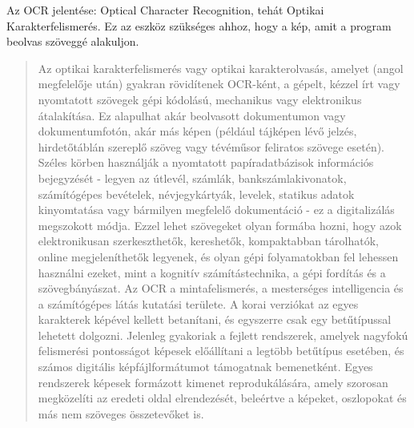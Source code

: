 
Az OCR jelentése: Optical Character Recognition, tehát Optikai Karakterfelismerés. Ez az eszköz szükséges ahhoz, hogy a kép, amit a program beolvas szöveggé alakuljon.

\begin{quotation}
Az optikai karakterfelismerés vagy optikai karakterolvasás, amelyet (angol megfelelője után) gyakran rövidítenek OCR-ként, a gépelt, kézzel írt vagy nyomtatott szövegek gépi kódolású, mechanikus vagy elektronikus átalakítása. Ez alapulhat akár beolvasott dokumentumon vagy dokumentumfotón, akár más képen (például tájképen lévő jelzés, hirdetőtáblán szereplő szöveg vagy tévéműsor feliratos szövege esetén). Széles körben használják a nyomtatott papíradatbázisok információs bejegyzését - legyen az útlevél, számlák, bankszámlakivonatok, számítógépes bevételek, névjegykártyák, levelek, statikus adatok kinyomtatása vagy bármilyen megfelelő dokumentáció - ez a digitalizálás megszokott módja. Ezzel lehet szövegeket olyan formába hozni, hogy azok elektronikusan szerkeszthetők, kereshetők, kompaktabban tárolhatók, online megjeleníthetők legyenek, és olyan gépi folyamatokban fel lehessen használni ezeket, mint a kognitív számítástechnika, a gépi fordítás és a szövegbányászat. Az OCR a mintafelismerés, a mesterséges intelligencia és a számítógépes látás kutatási területe. A korai verziókat az egyes karakterek képével kellett betanítani, és egyszerre csak egy betűtípussal lehetett dolgozni. Jelenleg gyakoriak a fejlett rendszerek, amelyek nagyfokú felismerési pontosságot képesek előállítani a legtöbb betűtípus esetében, és számos digitális képfájlformátumot támogatnak bemenetként. Egyes rendszerek képesek formázott kimenet reprodukálására, amely szorosan megközelíti az eredeti oldal elrendezését, beleértve a képeket, oszlopokat és más nem szöveges összetevőket is.
\end{quotation}

